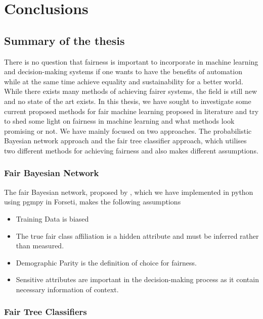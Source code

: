 \chapter{Conclusions}
\label{ch:conclusion}

\section{Summary of the thesis}

There is no question that fairness is important to incorporate in machine learning and decision-making systems if one wants to have the benefits of automation while at the same time achieve equality and sustainability for a better world. While there exists many methods of achieving fairer systems, the field is still new and no state of the art exists. In this thesis, we have sought to investigate some current proposed methods for fair machine learning proposed in literature and try to shed some light on fairness in machine learning and what methods look promising or not. We have mainly focused on two approaches. The probabilistic Bayesian network approach and the fair tree classifier approach, which utilises two different methods for achieving fairness and also makes different assumptions. 

\subsection{Fair Bayesian Network}

The fair Bayesian network, proposed by \citet{Choi:2021:AIII}, which we have implemented in python using pgmpy in Forseti, makes the following assumptions

\begin{itemize}
    \item Training Data is biased
    \item The true fair class affiliation is a hidden attribute and must be inferred rather than measured.
    \item Demographic Parity is the definition of choice for fairness.
    \item Sensitive attributes are important in the decision-making process as it contain necessary information of context.
\end{itemize}

\subsection{Fair Tree Classifiers}

